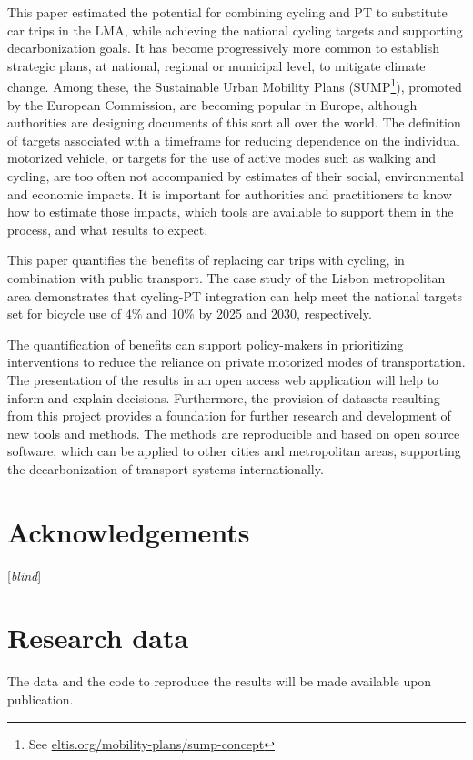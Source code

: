 \documentclass[review, doubleblind, 3p,
authoryear]{elsarticle} %
\begin{document}
This paper estimated the potential for combining cycling and PT to
substitute car trips in the LMA, while achieving the national cycling
targets and supporting decarbonization goals. It has become
progressively more common to establish strategic plans, at national,
regional or municipal level, to mitigate climate change. Among these,
the Sustainable Urban Mobility Plans (SUMP\footnote{See
  \href{https://www.eltis.org/mobility-plans/sump-concept}{eltis.org/mobility-plans/sump-concept}}),
promoted by the European Commission, are becoming popular in Europe,
although authorities are designing documents of this sort all over the
world. The definition of targets associated with a timeframe for
reducing dependence on the individual motorized vehicle, or targets for
the use of active modes such as walking and cycling, are too often not
accompanied by estimates of their social, environmental and economic
impacts. It is important for authorities and practitioners to know how
to estimate those impacts, which tools are available to support them in
the process, and what results to expect.

This paper quantifies the benefits of replacing car trips with cycling,
in combination with public transport. The case study of the Lisbon
metropolitan area demonstrates that cycling-PT integration can help meet
the national targets set for bicycle use of 4\% and 10\% by 2025 and
2030, respectively.

The quantification of benefits can support policy-makers in prioritizing
interventions to reduce the reliance on private motorized modes of
transportation. The presentation of the results in an open access web
application will help to inform and explain decisions. Furthermore, the
provision of datasets resulting from this project provides a foundation
for further research and development of new tools and methods. The
methods are reproducible and based on open source software, which can be
applied to other cities and metropolitan areas, supporting the
decarbonization of transport systems internationally.

\section*{Acknowledgements}\label{acknowledgements}

{[}\emph{blind}{]}

\section*{Research data}\label{research-data}

The data and the code to reproduce the results will be made available
upon publication.

\renewcommand\refname{References}

\end{document}
